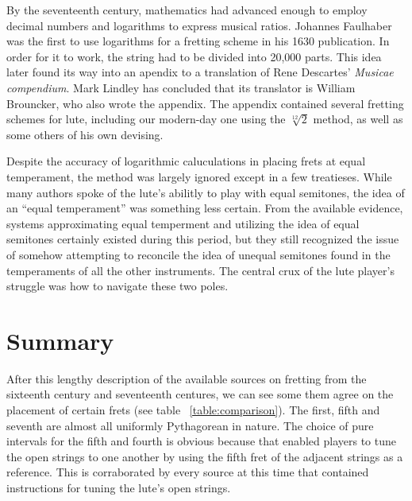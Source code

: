 By the seventeenth century, mathematics had advanced enough to employ decimal numbers and
logarithms to express musical ratios.  Johannes Faulhaber was the first to use logarithms for
a fretting scheme in his 1630 publication. \autocite[21]{ML:1}  In order for it to work, the
string had to be divided into 20,000 parts.  This idea later found its way into an apendix
to a translation of Rene Descartes' \textit{Musicae compendium}.  Mark Lindley has concluded
that its translator is William Brouncker, who also wrote the appendix.  The appendix contained
several fretting schemes for lute, including our modern-day one using the $ \sqrt[12]{2} $ method,
as well as some others of his own devising.

Despite the accuracy of logarithmic caluculations in placing frets at equal temperament, the
method was largely ignored except in a few treatieses.  While many authors spoke of the lute's
abilitly to play with equal semitones, the idea of an ``equal temperament'' was something less
certain.  From the available evidence, systems approximating equal temperment and utilizing
the idea of equal semitones certainly existed during this period, but they still recognized
the issue of somehow attempting to reconcile the idea of unequal semitones found in the
temperaments of all the other instruments.  The central crux of the lute player's struggle
was how to navigate these two poles.

\section{Summary}
After this lengthy description of the available sources on fretting from the sixteenth century
and seventeenth centures,
we can see some them agree on the placement of certain frets (see table ~\ref{table:comparison}).
The first, fifth and seventh are  almost all uniformly Pythagorean in nature.  The choice of pure
intervals for the fifth and fourth
is obvious because that enabled players to tune the open strings to one another by using the fifth
fret of the adjacent strings as a reference.  This is corraborated by every source at this time
that contained instructions for tuning the lute's open strings.

